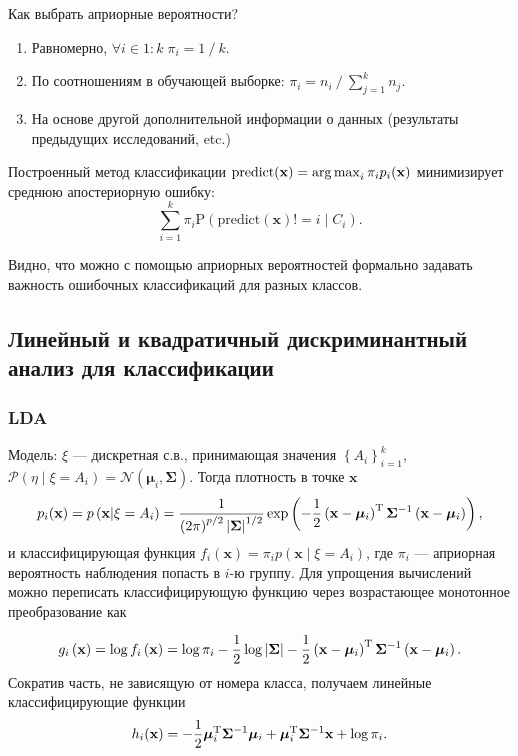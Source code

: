 	Как выбрать априорные вероятности?

	\begin{enumerate}
		\item Равномерно, $\forall i \in 1\mathbin : k \; \pi_i = 1 \mathbin / k$.
		\item По соотношениям в обучающей выборке: $\pi_i = n_i \mathbin / \sum_{j=1}^k n_j$.
		\item На основе другой дополнительной информации о данных (результаты предыдущих исследований, etc.)
	\end{enumerate}

\begin{prop}
Построенный метод классификации $\mathrm{predict}(\mathbf{x}) = \operatorname*{arg\,max}_i \pi_i p_i(\mathbf{x})$ минимизирует среднюю апостериорную ошибку:
$$\sum_{i=1}^k \pi_i \mathrm P(\mathrm{predict}(\mathbf{x}) != i\mid C_i).$$
\end{prop}

Видно, что можно с помощью априорных вероятностей формально задавать важность ошибочных классификаций
для разных классов.

%
\subsection{Линейный и квадратичный дискриминантный анализ для классификации}
	\subsubsection{LDA} %
	\label{ssub:lda}
		Модель: $\xi$ --- дискретная с.в., принимающая значения $\left\lbrace A_i\right\rbrace_{i=1}^k$, $\mathcal P(\eta\mid \xi = A_i) = \mathcal N\left(\bm{\mu}_i, \bm{\Sigma}\right)$. Тогда плотность в точке $\mathbf{x}$
		$$p_i(\mathbf{x}) = p\left(\mathbf{x}\middle\vert \xi = A_i\right) = \frac{1}{\left(2\pi\right)^{p/2}\left\vert\bm{\Sigma}\right\vert^{1/2}} \exp\left(-\frac{1}{2}\left(\mathbf{x} - \bm{\mu}_i\right)^{\mathrm{T}}\bm{\Sigma}^{-1}\left(\mathbf{x} - \bm{\mu}_i\right)\right),$$
		и классифицирующая функция $f_i\left(\mathbf{x}\right) = \pi_i p\left(\mathbf{x}\middle\vert \xi = A_i\right)$, где $\pi_i$ --- априорная вероятность наблюдения попасть в $i$-ю группу. Для упрощения вычислений можно переписать классифицирующую функцию через возрастающее монотонное преобразование как

		$$g_i\left(\mathbf{x}\right) = \log f_i\left(\mathbf{x}\right) = \log \pi_i - \frac{1}{2}\log\left\vert\bm{\Sigma}\right\vert -  \frac{1}{2}\left(\mathbf{x} - \bm{\mu}_i\right)^{\mathrm{T}}\bm{\Sigma}^{-1}\left(\mathbf{x} - \bm{\mu}_i\right).$$
Сократив часть, не зависящую от номера класса, получаем линейные классифицирующие функции
$$h_i(\mathbf{x}) = -\frac{1}{2}\bm{\mu}_i^{\mathrm{T}}\bm{\Sigma}^{-1}\bm{\mu}_i + \bm{\mu}_i^{\mathrm{T}}\bm{\Sigma}^{-1}\mathbf{x} + \log\pi_i.$$

